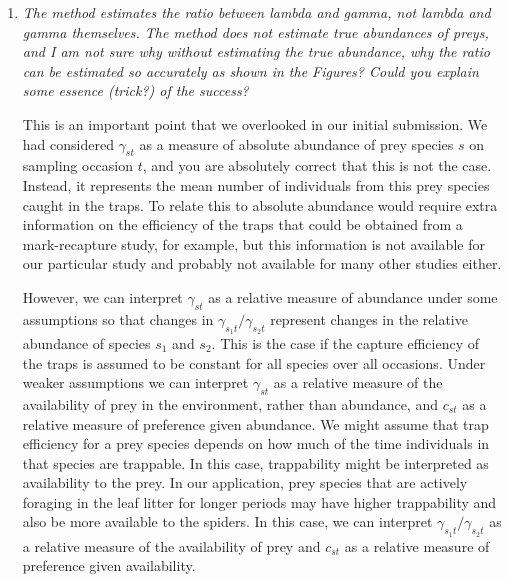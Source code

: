 \documentclass[12pt]{article}
\begin{document}
\begin{enumerate}
\item \textit{ The method estimates the ratio between lambda and gamma, not lambda and gamma themselves. The method does not estimate true abundances of preys, and I am not sure why without estimating the true abundance, why the ratio can be estimated so accurately as shown in the Figures? Could you explain some essence (trick?) of the success?}


This is an important point that we overlooked in our initial submission. We had considered $\gamma_{st}$ as a measure of absolute abundance of prey species $s$ on sampling occasion $t$, and you are absolutely correct that this is not the case. Instead, it represents the mean number of individuals from this prey species caught in the traps. To relate this to absolute abundance would require extra information on the efficiency of the traps that could be obtained from a mark-recapture study, for example, but this information is not available for our particular study and probably not available for many other studies either.

However, we can interpret $\gamma_{st}$ as a relative measure of abundance under some assumptions so that changes in $\gamma_{s_1t}/\gamma_{s_2t}$ represent changes in the relative abundance of species $s_1$ and $s_2$. This is the case if the capture efficiency of the traps is assumed to be constant for all species over all occasions. Under weaker assumptions we can interpret $\gamma_{st}$ as a relative measure of the availability of prey in the environment, rather than abundance, and $c_{st}$ as a relative measure of preference given abundance. We might assume that trap efficiency for a prey species depends on how much of the time individuals in that species are trappable. In this case, trappability might be interpreted as availability to the prey. In our application, prey species that are actively foraging in the leaf litter for longer periods may have higher trappability and also be more available to the spiders. In this case, we can interpret $\gamma_{s_1t}/\gamma_{s_2t}$ as a relative measure of the availability of prey and $c_{st}$ as a relative measure of preference given availability. 


\end{enumerate}
\end{document}
